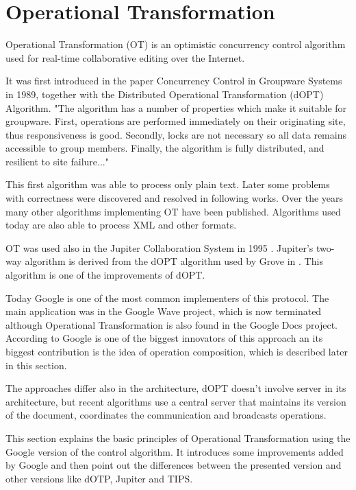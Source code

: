 \documentclass[12pt,oneside]{fithesis2}
\begin{document}
\section{Operational Transformation}
\par Operational Transformation (OT) is an optimistic concurrency control algorithm used for real-time collaborative editing over the Internet. 
\par It was first introduced in the paper Concurrency Control in Groupware Systems \cite{Ellis} in 1989, together with the Distributed Operational Transformation (dOPT) Algorithm. "The algorithm has a number of properties which make it suitable for groupware. First, operations are performed immediately on their originating site, thus responsiveness is good. Secondly, locks are not necessary so all data remains accessible to group members. Finally, the algorithm is fully distributed, and resilient to site failure..."\cite{Ellis} \par This first algorithm was able to process only plain text. Later some problems with correctness were discovered and resolved in following works. Over the years many other algorithms implementing OT have been published. Algorithms used today are also able to process XML and other formats. \par OT was used also in the Jupiter Collaboration System in 1995 \cite{Jupiter}. Jupiter's two-way algorithm is derived from the dOPT algorithm used by Grove in \cite{Ellis}. This algorithm is one of the improvements of dOPT. \par Today Google is one of the most common implementers of this protocol. The main application was in the Google Wave project, which is now terminated although Operational Transformation is also found in the Google Docs project. According to \cite{Spiewak} Google is one of the biggest innovators of this approach an its biggest contribution is the idea of operation composition, which is described later in this section. \par The approaches differ also in the architecture, dOPT doesn't involve server in its architecture, but recent algorithms use a central server that maintains its version of the document, coordinates the communication and broadcasts operations.
\par This section explains the basic principles of Operational Transformation using the Google version of the control algorithm. It introduces some improvements added by Google and then point out the differences between the presented version and other versions like dOTP, Jupiter and TIPS. 
\end{document}
